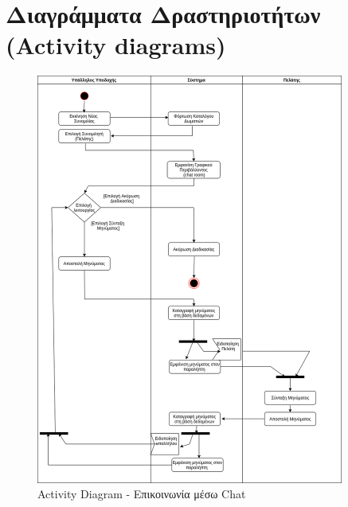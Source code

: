 \section{Διαγράμματα Δραστηριοτήτων (Activity diagrams)}
\begin{figure}[H]
	\centering
	\includegraphics[width=0.9\textwidth]{Images/Activity-Chat}
	\caption{Activity Diagram - Επικοινωνία μέσω Chat}
	\label{Activity - Chat }
\end{figure}

